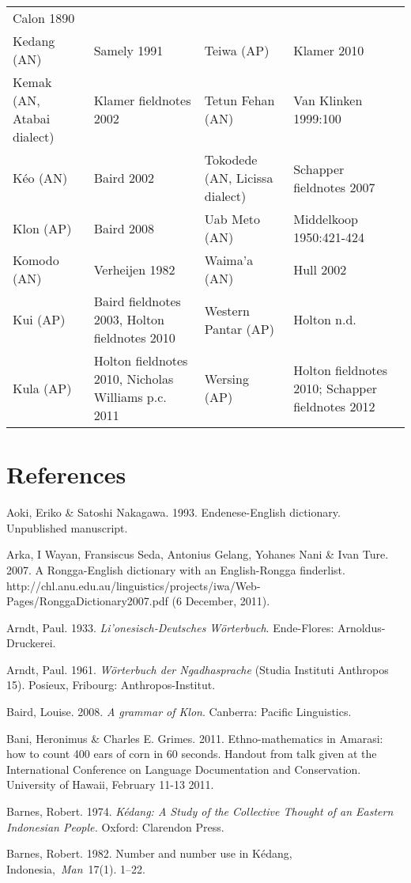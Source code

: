 \begin{flushleft}
\begin{supertabular}{m{1.0830599in}m{1.7080599in}m{1.7962599in}m{1.7115599in}}
Calon 1890\\
Kedang (AN) &
Samely 1991 &
Teiwa (AP) &
Klamer 2010\\
Kemak (AN, Atabai dialect) &
Klamer fieldnotes 2002 &
Tetun Fehan (AN)  &
Van Klinken 1999:100\\
K\'eo (AN) &
Baird 2002 &
Tokodede (AN, Licissa dialect) &
Schapper fieldnotes 2007\\
Klon (AP) &
Baird 2008 &
Uab Meto (AN) &
Middelkoop 1950:421-424\\
Komodo (AN) &
Verheijen 1982 &
Waima{\textquoteright}a (AN) &
Hull 2002\\
Kui (AP) &
Baird fieldnotes 2003, Holton fieldnotes 2010 &
Western Pantar (AP) &
Holton n.d. \\
Kula (AP) &
Holton fieldnotes 2010, Nicholas Williams p.c. 2011 &
Wersing (AP) &
Holton fieldnotes 2010; Schapper fieldnotes 2012\\
\end{supertabular}
\end{flushleft}
\section[References]{References}
Aoki, Eriko \& Satoshi Nakagawa. 1993. Endenese-English dictionary. Unpublished manuscript.

Arka, I Wayan, Fransiscus Seda, Antonius Gelang, Yohanes Nani \& Ivan Ture. 2007. A Rongga-English dictionary with an English-Rongga finderlist. http://chl.anu.edu.au/linguistics/projects/iwa/Web-Pages/RonggaDictionary2007.pdf (6 December, 2011).

Arndt, Paul. 1933. \textit{Li{\textquoteright}onesisch-Deutsches W\"orterbuch}. Ende-Flores: Arnoldus-Druckerei.

Arndt, Paul. 1961. \textit{W\"orterbuch der Ngadhasprache} (Studia Instituti Anthropos 15). Posieux, Fribourg: Anthropos-Institut.

Baird, Louise. 2008. \textit{A grammar of Klon}. Canberra: Pacific Linguistics.

Bani, Heronimus \& Charles E. Grimes. 2011. Ethno-mathematics in Amarasi: how to count 400 ears of corn in 60 seconds. Handout from talk given at the International Conference on Language Documentation and Conservation. University of Hawaii, February 11-13 2011.

Barnes, Robert. 1974. \textit{K\'edang: A Study of the Collective Thought of an Eastern Indonesian People.} Oxford: Clarendon Press.

Barnes, Robert. 1982. Number and number use in K\'edang, Indonesia,~\textit{Man}~17(1). 1--22.

